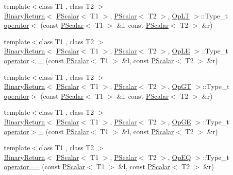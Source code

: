 \begin{DoxyCompactItemize}
\item 
{\footnotesize template$<$class T1 , class T2 $>$ }\\\mbox{\hyperlink{structENSEM_1_1BinaryReturn}{Binary\+Return}}$<$ \mbox{\hyperlink{classENSEM_1_1PScalar}{P\+Scalar}}$<$ T1 $>$, \mbox{\hyperlink{classENSEM_1_1PScalar}{P\+Scalar}}$<$ T2 $>$, \mbox{\hyperlink{structENSEM_1_1OpLT}{Op\+LT}} $>$\+::Type\+\_\+t \mbox{\hyperlink{group__primscalar_ga898f0000029c1749bdd5a60160848adb}{operator$<$}} (const \mbox{\hyperlink{classENSEM_1_1PScalar}{P\+Scalar}}$<$ T1 $>$ \&l, const \mbox{\hyperlink{classENSEM_1_1PScalar}{P\+Scalar}}$<$ T2 $>$ \&r)
\item 
{\footnotesize template$<$class T1 , class T2 $>$ }\\\mbox{\hyperlink{structENSEM_1_1BinaryReturn}{Binary\+Return}}$<$ \mbox{\hyperlink{classENSEM_1_1PScalar}{P\+Scalar}}$<$ T1 $>$, \mbox{\hyperlink{classENSEM_1_1PScalar}{P\+Scalar}}$<$ T2 $>$, \mbox{\hyperlink{structENSEM_1_1OpLE}{Op\+LE}} $>$\+::Type\+\_\+t \mbox{\hyperlink{group__primscalar_gadc72d49cf80f5b61a37c029861a74a5f}{operator$<$=}} (const \mbox{\hyperlink{classENSEM_1_1PScalar}{P\+Scalar}}$<$ T1 $>$ \&l, const \mbox{\hyperlink{classENSEM_1_1PScalar}{P\+Scalar}}$<$ T2 $>$ \&r)
\item 
{\footnotesize template$<$class T1 , class T2 $>$ }\\\mbox{\hyperlink{structENSEM_1_1BinaryReturn}{Binary\+Return}}$<$ \mbox{\hyperlink{classENSEM_1_1PScalar}{P\+Scalar}}$<$ T1 $>$, \mbox{\hyperlink{classENSEM_1_1PScalar}{P\+Scalar}}$<$ T2 $>$, \mbox{\hyperlink{structENSEM_1_1OpGT}{Op\+GT}} $>$\+::Type\+\_\+t \mbox{\hyperlink{group__primscalar_gac4bbd6e76f1d5dfb8c50417f131c43a0}{operator$>$}} (const \mbox{\hyperlink{classENSEM_1_1PScalar}{P\+Scalar}}$<$ T1 $>$ \&l, const \mbox{\hyperlink{classENSEM_1_1PScalar}{P\+Scalar}}$<$ T2 $>$ \&r)
\item 
{\footnotesize template$<$class T1 , class T2 $>$ }\\\mbox{\hyperlink{structENSEM_1_1BinaryReturn}{Binary\+Return}}$<$ \mbox{\hyperlink{classENSEM_1_1PScalar}{P\+Scalar}}$<$ T1 $>$, \mbox{\hyperlink{classENSEM_1_1PScalar}{P\+Scalar}}$<$ T2 $>$, \mbox{\hyperlink{structENSEM_1_1OpGE}{Op\+GE}} $>$\+::Type\+\_\+t \mbox{\hyperlink{group__primscalar_ga149cf6b2bcbe466aae6c6e90ee265c50}{operator$>$=}} (const \mbox{\hyperlink{classENSEM_1_1PScalar}{P\+Scalar}}$<$ T1 $>$ \&l, const \mbox{\hyperlink{classENSEM_1_1PScalar}{P\+Scalar}}$<$ T2 $>$ \&r)
\item 
{\footnotesize template$<$class T1 , class T2 $>$ }\\\mbox{\hyperlink{structENSEM_1_1BinaryReturn}{Binary\+Return}}$<$ \mbox{\hyperlink{classENSEM_1_1PScalar}{P\+Scalar}}$<$ T1 $>$, \mbox{\hyperlink{classENSEM_1_1PScalar}{P\+Scalar}}$<$ T2 $>$, \mbox{\hyperlink{structENSEM_1_1OpEQ}{Op\+EQ}} $>$\+::Type\+\_\+t \mbox{\hyperlink{group__primscalar_ga2834c2d31221ad19c3251f77a4b404f4}{operator==}} (const \mbox{\hyperlink{classENSEM_1_1PScalar}{P\+Scalar}}$<$ T1 $>$ \&l, const \mbox{\hyperlink{classENSEM_1_1PScalar}{P\+Scalar}}$<$ T2 $>$ \&r)

\end{DoxyCompactItemize}
